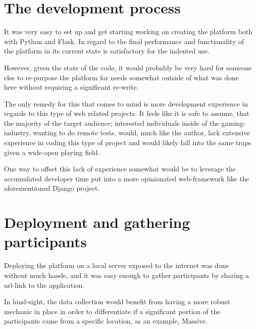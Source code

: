 \section{The development process}

  It was very easy to set up and get starting working on creating the platform
  both with Python and Flask. In regard to the final performance and
  functionality of the platform in its current state is satisfactory for the
  indented use.

  However, given the state of the code, it would probably be very hard for
  someone else to re-purpose the platform for needs somewhat outside of what
  was done here without requiring a significant re-write.

  The only remedy for this that comes to mind is more development experience in
  regards to this type of web related projects. It feels like it is safe to
  assume, that the majority of the target audience; interested individuals
  inside of the gaming-industry, wanting to do remote tests, would, much like
  the author, lack extensive experience in coding this type of project and
  would likely fall into the same traps given a wide-open playing field.

  One way to offset this lack of experience somewhat would be to leverage the
  accumulated developer time put into a more opinionated web-framework like the
  aforementioned Django\cite{citeDjangoHomepage} project.



\section{Deployment and gathering participants}

  Deploying the platform on a local server exposed to the internet was done
  without much hassle, and it was easy enough to gather participants by
  sharing a url-link to the application.

  In hind-sight, the data collection would benefit from having a more robust
  mechanic in place in order to differentiate if a significant portion of the
  participants came from a specific location, as an example, Massive.

